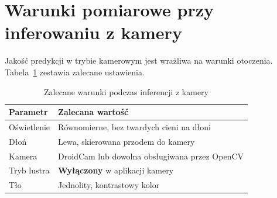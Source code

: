 \section{Warunki pomiarowe przy inferowaniu z kamery}

Jakość predykcji w trybie kamerowym jest wrażliwa na warunki otoczenia.
Tabela~\ref{tab:warunki} zestawia zalecane ustawienia.

\begin{table}[H]
    \centering
    \caption{Zalecane warunki podczas inferencji z kamery}
    \label{tab:warunki}
    \begin{tabular}{ll}
        \toprule
        \textbf{Parametr} & \textbf{Zalecana wartość} \\
        \midrule
        Oświetlenie   & Równomierne, bez twardych cieni na dłoni \\
        Dłoń          & Lewa, skierowana przodem do kamery \\
        Kamera        & DroidCam lub dowolna obsługiwana przez OpenCV \\
        Tryb lustra   & \textbf{Wyłączony} w aplikacji kamery \\
        Tło           & Jednolity, kontrastowy kolor \\
        \bottomrule
    \end{tabular}
\end{table}
